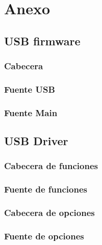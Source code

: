 \chapter{Anexo}





\clearpage
\section{USB firmware}
\subsection{Cabecera}


\subsection{Fuente USB}


\subsection{Fuente Main}


\section{USB Driver}
\subsection{Cabecera de funciones}


\subsection{Fuente de funciones}


\subsection{Cabecera de opciones}


\subsection{Fuente de opciones}


